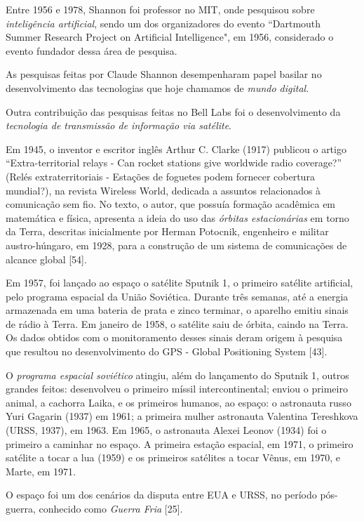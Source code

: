 \documentclass{hipatia}
\begin{document}
Entre 1956 e 1978, Shannon foi professor no MIT, onde pesquisou sobre \textit{inteligência artificial}, sendo um dos organizadores do evento ``Dartmouth Summer Research Project on Artificial Intelligence", em 1956, considerado o evento fundador dessa área de pesquisa.

As pesquisas feitas por Claude Shannon desempenharam papel basilar no desenvolvimento das tecnologias que hoje chamamos de \textit{mundo digital}.

Outra contribuição das pesquisas feitas no Bell Labs foi o desenvolvimento da \textit{tecnologia de transmissão de informação via satélite}.

Em 1945, o inventor e escritor inglês Arthur C. Clarke (1917) publicou o artigo ``Extra-territorial relays - Can rocket stations give worldwide radio coverage?'' (Relés extraterritoriais - Estações de foguetes podem fornecer cobertura mundial?), na revista Wireless World, dedicada a assuntos relacionados à comunicação sem fio. No texto, o autor, que possuía formação acadêmica em matemática e física, apresenta a ideia do uso das \textit{órbitas estacionárias} em torno da Terra, descritas inicialmente por Herman Potocnik, engenheiro e militar austro-húngaro, em 1928, para a construção de um sistema de comunicações de alcance global [54].

Em 1957, foi lançado ao espaço o satélite Sputnik 1, o primeiro satélite artificial, pelo programa espacial da União Soviética. Durante três semanas, até a energia armazenada  em uma bateria de prata e zinco terminar, o aparelho emitiu sinais de rádio à Terra. Em janeiro de 1958, o satélite saiu de órbita, caindo na Terra. Os dados obtidos com o monitoramento desses sinais deram origem à pesquisa que resultou no desenvolvimento do GPS - Global Positioning System [43].

O \textit{programa espacial soviético} atingiu, além do lançamento do Sputnik 1, outros grandes feitos: desenvolveu o primeiro míssil intercontinental; enviou o primeiro animal, a cachorra Laika, e os primeiros humanos, ao espaço: o astronauta russo Yuri Gagarin (1937) em 1961; a primeira mulher astronauta Valentina Tereshkova (URSS, 1937), em 1963. Em 1965, o astronauta Alexei Leonov (1934) foi o primeiro a caminhar no espaço. A primeira estação espacial, em 1971, o primeiro satélite a tocar a lua (1959) e os primeiros satélites a tocar Vênus, em 1970, e Marte, em 1971.

O espaço foi um dos cenários da disputa entre EUA e URSS, no período pós-guerra, conhecido como \textit{Guerra Fria} 	[25].
\end{document}
